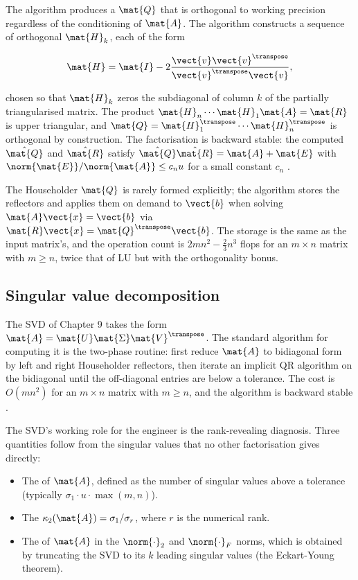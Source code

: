 The  algorithm produces a $\mat{Q}$ that
is orthogonal to working precision regardless of the conditioning
of $\mat{A}$. The algorithm constructs a sequence of orthogonal
 $\mat{H}_{k}$, each of the form

\[
\mat{H} = \mat{I} - 2 \frac{\vect{v}\vect{v}^{\transpose}}
{\vect{v}^{\transpose}\vect{v}},
\]

chosen so that $\mat{H}_{k}$ zeros the subdiagonal of column $k$
of the partially triangularised matrix. The product $\mat{H}_{n}
\cdots \mat{H}_{1} \mat{A} = \mat{R}$ is upper triangular, and
$\mat{Q} = \mat{H}_{1}^{\transpose}\cdots\mat{H}_{n}^{\transpose}$
is orthogonal by construction. The factorisation is backward
stable: the computed $\hat{\mat{Q}}$ and $\hat{\mat{R}}$ satisfy
$\hat{\mat{Q}}\hat{\mat{R}} = \mat{A} + \mat{E}$ with
$\norm{\mat{E}}/\norm{\mat{A}} \leq c_{n} u$ for a small constant
$c_{n}$ \cite[ch.~10]{text:trefethen-bau1997}.

The Householder $\mat{Q}$ is rarely formed explicitly; the
algorithm stores the reflectors and applies them on demand to
$\vect{b}$ when solving $\mat{A}\vect{x} = \vect{b}$ via
$\mat{R}\vect{x} = \mat{Q}^{\transpose}\vect{b}$. The storage is
the same as the input matrix's, and the operation count is
$2 m n^{2} - \frac{2}{3} n^{3}$ flops for an $m \times n$ matrix
with $m \geq n$, twice that of LU but with the orthogonality
bonus.

\subsection{Singular value decomposition}

The SVD of Chapter 9 takes the form $\mat{A} = \mat{U}\mat{\Sigma}
\mat{V}^{\transpose}$. The standard algorithm for computing it is
the  two-phase routine: first reduce
$\mat{A}$ to bidiagonal form by left and right Householder
reflectors, then iterate an implicit QR algorithm on the
bidiagonal until the off-diagonal entries are below a tolerance.
The cost is $O(m n^{2})$ for an $m \times n$ matrix with $m \geq
n$, and the algorithm is backward stable
\cite[ch.~31]{text:trefethen-bau1997}.

The SVD's working role for the engineer is the rank-revealing
diagnosis. Three quantities follow from the singular values that
no other factorisation gives directly:

\begin{itemize}[leftmargin=*]
  \item The  of $\mat{A}$, defined as the
    number of singular values above a tolerance (typically
    $\sigma_{1} \cdot u \cdot \max(m, n)$).
  \item The  $\kappa_{2}(\mat{A})
    = \sigma_{1}/\sigma_{r}$, where $r$ is the numerical rank.
  \item The  of $\mat{A}$ in
    the $\norm{\cdot}_{2}$ and $\norm{\cdot}_{F}$ norms, which is
    obtained by truncating the SVD to its $k$ leading singular
    values (the Eckart-Young theorem).
\end{itemize}

